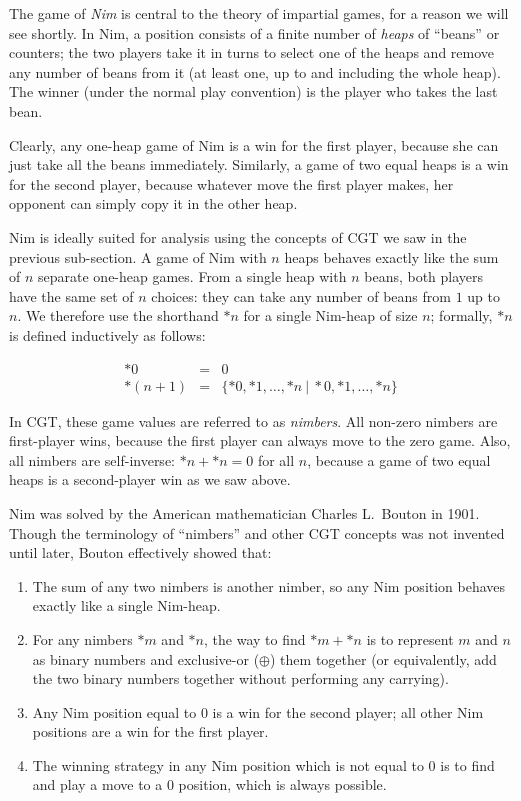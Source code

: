 \documentclass[a4paper,twocolumn]{article}
\newcommand{\cgtgame}[2]{\{#1 \:|\: #2\}}
\begin{document}
The game of \emph{Nim} is central to the theory of impartial games,
for a reason we will see shortly. In Nim, a position consists of a
finite number of \emph{heaps} of ``beans'' or counters; the two
players take it in turns to select one of the heaps and remove any
number of beans from it (at least one, up to and including the whole
heap). The winner (under the normal play convention) is the player who
takes the last bean.

Clearly, any one-heap game of Nim is a win for the first player,
because she can just take all the beans immediately. Similarly, a game
of two equal heaps is a win for the second player, because whatever
move the first player makes, her opponent can simply copy it in the
other heap.

Nim is ideally suited for analysis using the concepts of CGT we saw in
the previous sub-section. A game of Nim with $n$ heaps behaves exactly
like the sum of $n$ separate one-heap games. From a single heap with
$n$ beans, both players have the same set of $n$ choices: they can
take any number of beans from $1$ up to $n$. We therefore use the
shorthand $*n$ for a single Nim-heap of size $n$; formally, $*n$ is
defined inductively as follows:

\begin{eqnarray*}
  *0 & = & 0 \\
  *(n+1) & = & \cgtgame{*0, *1, \ldots, *n}{*0, *1, \ldots, *n}
\end{eqnarray*}

In CGT, these game values are referred to as \emph{nimbers}. All
non-zero nimbers are first-player wins, because the first player can
always move to the zero game. Also, all nimbers are self-inverse: $*n
+ *n = 0$ for all $n$, because a game of two equal heaps is a
second-player win as we saw above.

Nim was solved by the American mathematician Charles L.\ Bouton in
1901. Though the terminology of ``nimbers'' and other CGT concepts was
not invented until later, Bouton effectively showed that:

\begin{enumerate}
  \item The sum of any two nimbers is another nimber, so any Nim
    position behaves exactly like a single Nim-heap.
  \item For any nimbers $*m$ and $*n$, the way to find $*m + *n$ is to
    represent $m$ and $n$ as binary numbers and exclusive-or
    ($\oplus$) them together (or equivalently, add the two binary
    numbers together without performing any carrying).
  \item Any Nim position equal to $0$ is a win for the second player;
    all other Nim positions are a win for the first player.
  \item The winning strategy in any Nim position which is not equal to
    $0$ is to find and play a move to a $0$ position, which is always
    possible.
\end{enumerate}
\end{document}
